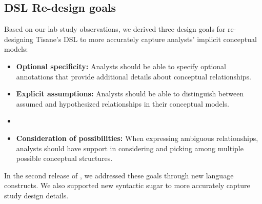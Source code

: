 \subsection{DSL Re-design goals} \label{sec:rtisane_design_implications} 

Based on our lab study observations, we derived three design goals for
re-designing Tisane's DSL to more accurately capture analysts' implicit
conceptual models: 

\def\optionalSpecificity{\textbf{Optional specificity:}\xspace}
\def\considerPossibilities{\textbf{Consideration of possibilities:}\xspace}
\def\assumeHypothesize{\textbf{Explicit assumptions:}\xspace}
\begin{itemize}
    \item \optionalSpecificity Analysts should be able to specify optional annotations that provide
    additional details about conceptual relationships.
    \item \assumeHypothesize Analysts should be able to distinguish between assumed and hypothesized relationships in their conceptual models. 
    \item \item \considerPossibilities When expressing ambiguous relationships, analysts should have support
    in considering and picking among multiple possible conceptual structures.
\end{itemize}

In the second release of \tisane, we addressed these goals through new language
constructs. We also supported new syntactic sugar to more accurately capture
study design details. 

